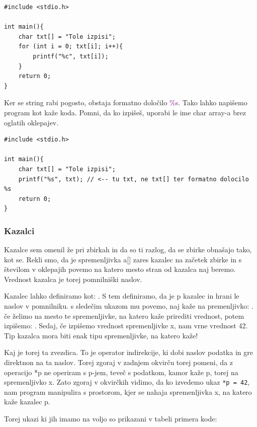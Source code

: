 \documentclass[a4paper, 12pt]{article}
\begin{document}
\begin{lstlisting}[caption = Znakovni niz: navajanje 1]
#include <stdio.h>

int main(){
	char txt[] = "Tole izpisi";
	for (int i = 0; txt[i]; i++){
		printf("%c", txt[i]);
	}
	return 0;
}
\end{lstlisting}

Ker se string rabi pogosto, obstaja formatno določilo \textcolor{purple}{\%s}. Tako lahko napišemo program kot kaže koda. Pomni, da ko izpišeš, uporabi le ime char array-a brez oglatih oklepajev.

\begin{lstlisting}[caption = Znakovni niz: navajanje 2]
#include <stdio.h>

int main(){
	char txt[] = "Tole izpisi";
	printf("%s", txt); // <-- tu txt, ne txt[] ter formatno dolocilo %s
	return 0;
}
\end{lstlisting}

\subsubsection{Kazalci}

Kazalce sem omenil že pri zbirkah in da so ti razlog, da se zbirke obnašajo tako, kot se. Rekli smo, da je spremenljivka a[] zares kazalec na začetek zbirke in s številom v oklepajih povemo na katero mesto stran od kazalca naj beremo. Vrednost kazalca je torej pomnilniški naslov.\

Kazalec lahko definiramo kot: . S tem definiramo, da je p kazalec in hrani le naslov v pomnilniku. s sledečim ukazom mu povemo, naj kaže na premenljivko:  . če želimo na mesto te spremenljivke, na katero kaže prirediti vrednost, potem izpišemo: . Sedaj, če izpišemo vrednost spremenljivke x, nam vrne vrednost 42. Tip kazalca mora biti enak tipu spremenljivke, na katero kaže!\

Kaj je torej ta zvezdica. To je operator indirekcije, ki dobi naslov podatka in gre direktnon na ta naslov. Torej zgoraj v zadnjem okvirču torej pomeni, da z operacijo *p ne operiram s p-jem, teveč s podatkom, kamor kaže p, torej na spremenljivko x. Zato zgoraj v okvirčkih vidimo, da ko izvedemo ukaz \lstinline|*p = 42|, nam program manipulira s prostorom, kjer se nahaja spremenljivka x, na katero kaže kazalec p.

Torej ukazi ki jih imamo na voljo so prikazani v tabeli primera kode:
\end{document}
